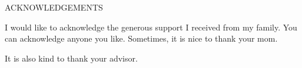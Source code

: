\documentclass[main.tex]{subfiles}
\begin{document}
\newpage

\begin{center}
ACKNOWLEDGEMENTS
\end{center}

I would like to acknowledge the generous support I received from my family. You can acknowledge anyone
you like.  Sometimes, it is nice to thank your mom.

It is also kind to thank your advisor.
\end{document}
